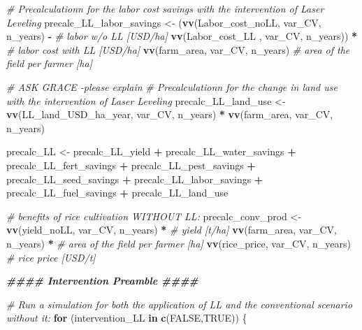 \documentclass[
]{article}
\newenvironment{Shaded}{\begin{snugshade}}{\end{snugshade}}
\newcommand{\CommentTok}[1]{\textcolor[rgb]{0.56,0.35,0.01}{\textit{#1}}}
\newcommand{\ConstantTok}[1]{\textcolor[rgb]{0.56,0.35,0.01}{#1}}
\newcommand{\ControlFlowTok}[1]{\textcolor[rgb]{0.13,0.29,0.53}{\textbf{#1}}}
\newcommand{\DocumentationTok}[1]{\textcolor[rgb]{0.56,0.35,0.01}{\textbf{\textit{#1}}}}
\newcommand{\FunctionTok}[1]{\textcolor[rgb]{0.13,0.29,0.53}{\textbf{#1}}}
\newcommand{\NormalTok}[1]{#1}
\newcommand{\OtherTok}[1]{\textcolor[rgb]{0.56,0.35,0.01}{#1}}
\newcommand{\SpecialCharTok}[1]{\textcolor[rgb]{0.81,0.36,0.00}{\textbf{#1}}}
\begin{document}
\begin{Shaded}
\begin{Highlighting}[]
  \CommentTok{\# Precalculationn for the labor cost savings with the intervention of Laser Leveling}
\NormalTok{  precalc\_LL\_labor\_savings }\OtherTok{\textless{}{-}}
\NormalTok{    (}\FunctionTok{vv}\NormalTok{(Labor\_cost\_noLL, var\_CV, n\_years) }\SpecialCharTok{{-}} \CommentTok{\# labor w/o LL [USD/ha]}
    \FunctionTok{vv}\NormalTok{(Labor\_cost\_LL , var\_CV, n\_years)) }\SpecialCharTok{*} \CommentTok{\# labor cost with LL [USD/ha]}
    \FunctionTok{vv}\NormalTok{(farm\_area, var\_CV, n\_years) }\CommentTok{\# area of the field per farmer [ha]}
  
  \CommentTok{\# ASK GRACE {-}please explain}
  \CommentTok{\# Precalculationn for the change in land use with the intervention of Laser Leveling}
\NormalTok{   precalc\_LL\_land\_use }\OtherTok{\textless{}{-}}
    \FunctionTok{vv}\NormalTok{(LL\_land\_USD\_ha\_year, var\_CV, n\_years) }\SpecialCharTok{*}
    \FunctionTok{vv}\NormalTok{(farm\_area, var\_CV, n\_years) }
  
  
\NormalTok{  precalc\_LL }\OtherTok{\textless{}{-}}
\NormalTok{    precalc\_LL\_yield }\SpecialCharTok{+} 
\NormalTok{    precalc\_LL\_water\_savings }\SpecialCharTok{+}
\NormalTok{    precalc\_LL\_fert\_savings }\SpecialCharTok{+} 
\NormalTok{    precalc\_LL\_pest\_savings }\SpecialCharTok{+} 
\NormalTok{    precalc\_LL\_seed\_savings }\SpecialCharTok{+}
\NormalTok{    precalc\_LL\_labor\_savings }\SpecialCharTok{+}
\NormalTok{    precalc\_LL\_fuel\_savings }\SpecialCharTok{+} 
\NormalTok{    precalc\_LL\_land\_use}
    
    
    \CommentTok{\# benefits of rice cultivation WITHOUT LL:}
\NormalTok{  precalc\_conv\_prod }\OtherTok{\textless{}{-}}
    \FunctionTok{vv}\NormalTok{(yield\_noLL, var\_CV, n\_years) }\SpecialCharTok{*} \CommentTok{\# yield [t/ha]}
    \FunctionTok{vv}\NormalTok{(farm\_area, var\_CV, n\_years) }\SpecialCharTok{*} \CommentTok{\# area of the field per farmer [ha]}
    \FunctionTok{vv}\NormalTok{(rice\_price, var\_CV, n\_years) }\CommentTok{\# rice price [USD/t]}
  
  
  \DocumentationTok{\#\#\#\#  Intervention Preamble \#\#\#\#}
  
  \CommentTok{\# Run a simulation for both the application of LL and the conventional scenario without it:}
  \ControlFlowTok{for}\NormalTok{ (intervention\_LL }\ControlFlowTok{in} \FunctionTok{c}\NormalTok{(}\ConstantTok{FALSE}\NormalTok{,}\ConstantTok{TRUE}\NormalTok{))}
\NormalTok{      \{}
  

\end{Highlighting}
\end{Shaded}
\end{document}
